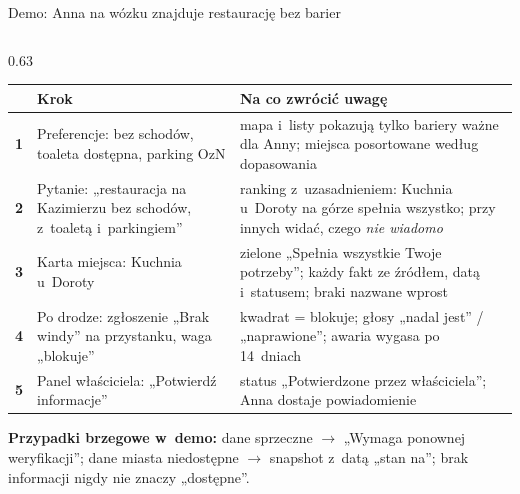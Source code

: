 \begin{frame}{Demo: Anna na wózku znajduje restaurację bez barier}
  \begin{columns}[T,onlytextwidth]
    \begin{column}{0.63\textwidth}
      \scriptsize
      \renewcommand{\arraystretch}{1.1}
      \begin{tabularx}{\textwidth}{@{}>{\bfseries\color{accNavy}}c >{\raggedright\arraybackslash}p{30mm} >{\raggedright\arraybackslash}X@{}}
        \toprule
        & \textbf{Krok} & \textbf{Na co zwrócić uwagę} \\
        \midrule
        1 & Preferencje: bez schodów, toaleta dostępna, parking OzN &
            mapa i~listy pokazują tylko bariery ważne dla Anny; miejsca posortowane według dopasowania \\
        2 & Pytanie: „restauracja na Kazimierzu bez schodów, z~toaletą i~parkingiem” &
            ranking z~uzasadnieniem: Kuchnia u~Doroty na górze spełnia wszystko; przy innych widać, czego \emph{nie wiadomo} \\
        3 & Karta miejsca: Kuchnia u~Doroty &
            zielone „Spełnia wszystkie Twoje potrzeby”; każdy fakt ze źródłem, datą i~statusem; braki nazwane wprost \\
        4 & Po drodze: zgłoszenie „Brak windy” na przystanku, waga „blokuje” &
            kwadrat = blokuje; głosy „nadal jest” / „naprawione”; awaria wygasa po 14~dniach \\
        5 & Panel właściciela: „Potwierdź informacje” &
            status „Potwierdzone przez właściciela”; Anna dostaje powiadomienie \\
        \bottomrule
      \end{tabularx}

      \vspace{1.5mm}
      \textbf{Przypadki brzegowe w~demo:} dane sprzeczne $\rightarrow$ „Wymaga ponownej weryfikacji”;
      dane miasta niedostępne $\rightarrow$ snapshot z~datą „stan na”; brak informacji nigdy nie znaczy „dostępne”.


\end{column}
\end{columns}
\end{frame}
